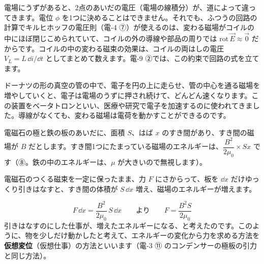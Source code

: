電場にうずがあると、2点のあいだの電圧（電場の線積分）が、道によって違ってきます。電位 $\phi$ を1つに決めることはできません。それでも、ふつうの回路の計算でキルヒホッフの電圧則（電-4 ⑦）が使えるのは、変わる磁場がコイルの中にほぼ閉じこめられていて、コイルの外の導線や部品の周りでは $\mathrm{rot}\,\vec E\approx\vec0$ だからです。コイルの中の変わる磁束の効果は、コイルの両はしの電圧 $V_L=L\,\dd i/\dd t$ としてまとめて数えます。電-9 ②では、この約束で回路の式を立てます。

\begin{phmijika}
ドーナツの形の真空の管の中で、電子を円の上に走らせ、管の中心を通る磁場を増やしていくと、電子は電場のうずに押され続けて、どんどん速くなります。この装置をベータトロンといい、医療や研究で電子を加速するのに使われてきました。導線がなくても、変わる磁場は電荷を動かすことができるのです。
\end{phmijika}

\label{ph:電-8:sec10}
\noindent\begin{minipage}[c]{0.4\linewidth}\centering
{}
\end{minipage}\hfill
\begin{minipage}[c]{0.57\linewidth}\raggedright
電磁石の極と鉄の板のあいだに、面積 $S$、はば $x$ のすき間があり、すき間の磁場が $B$ だとします。すき間1つにたまっている磁場のエネルギーは、$\dfrac{B^2}{2\mu_0}\times Sx$ です（⑧。鉄の中のエネルギーは、$\mu$ が大きいので無視します）。

電磁石のつくる磁束を一定に保ったまま、力 $F$ にさからって、板を $\dd x$ だけゆっくり引きはなすと、すき間の体積が $S\,\dd x$ 増え、磁場のエネルギーが増えます。
\end{minipage}
\[ F\,\dd x=\frac{B^2}{2\mu_0}\,S\,\dd x\qquad\text{より}\qquad F=\frac{B^2S}{2\mu_0} \]
\label{ph:電-8:kyuuin}引きはなすのにした仕事が、増えたエネルギーになる、と考えたのです。このように、物を少しだけ動かしたと考えて、エネルギーの変化から力を求める方法を\textbf{仮想変位}（仮想仕事）の方法といいます（電-3 ⑪ のコンデンサーの極板の引力と同じ方法）。

